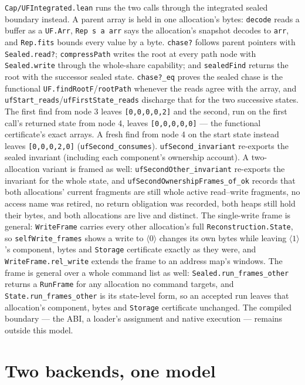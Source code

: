 \documentclass[10pt,a4paper]{article}
\newcommand{\file}[1]{\texttt{#1}}
\newcommand{\lean}[1]{\texttt{#1}}
\begin{document}
\file{Cap/UFIntegrated.lean} runs the two calls through the integrated sealed
boundary instead. A parent array is held in one allocation's bytes: \lean{decode}
reads a buffer as a \lean{UF.Arr}, \lean{Rep s a arr} says the allocation's
snapshot decodes to \lean{arr}, and \lean{Rep.fits} bounds every value by a byte.
\lean{chase?} follows parent pointers with \lean{Sealed.read?};
\lean{compressPath} writes the root at every path node with \lean{Sealed.write}
through the whole-share capability; and \lean{sealedFind} returns the root with
the successor sealed state. \lean{chase?\_eq} proves the sealed chase is the
functional \lean{UF.findRootF}/\lean{rootPath} whenever the reads agree with the
array, and \lean{ufStart\_reads}/\lean{ufFirstState\_reads} discharge that for the
two successive states. The first find from node 3 leaves \lean{[0,0,0,0,2]} and
the second, run on the first call's returned state from node 4, leaves
\lean{[0,0,0,0,0]} --- the functional certificate's exact arrays. A fresh find
from node 4 on the start state instead leaves \lean{[0,0,0,2,0]}
(\lean{ufSecond\_consumes}). \lean{ufSecond\_invariant} re-exports the sealed
invariant (including each component's ownership account). A two-allocation
variant is framed as well: \lean{ufSecondOther\_invariant} re-exports the
invariant for the whole state, and \lean{ufSecondOwnershipFrames\_of\_ok} records
that both allocations' current fragments are still whole active read--write
fragments, no access name was retired, no return obligation was recorded, both
heaps still hold their bytes, and both allocations are live and distinct. The
single-write frame is general: \lean{WriteFrame} carries every other allocation's
full \texttt{Reconstruction.State}, so \lean{selfWrite\_frames} shows a write to
$\langle0\rangle$ changes its own bytes while leaving $\langle1\rangle$'s
component, bytes and \texttt{Storage} certificate exactly as they were, and
\lean{WriteFrame.rel\_write} extends the frame to an address map's windows. The
frame is general over a whole command list as well:
\lean{Sealed.run\_frames\_other} returns a \lean{RunFrame} for any allocation no
command targets, and \lean{State.run\_frames\_other} is its state-level form, so
an accepted run leaves that allocation's component, bytes and \texttt{Storage}
certificate unchanged. The compiled boundary --- the ABI, a loader's assignment
and native execution --- remains outside this model.

\section{Two backends, one model}
\end{document}
